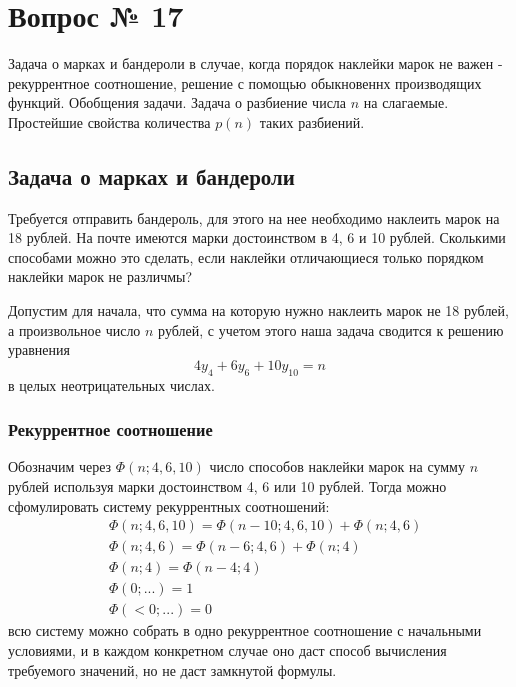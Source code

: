 \chapter{Вопрос № 17}

Задача о марках и бандероли в случае, когда порядок наклейки марок не важен - рекуррентное соотношение, решение с помощью обыкновеннх производящих функций. Обобщения задачи. Задача о разбиение числа $n$ на слагаемые. Простейшие свойства количества $p\left(n\right)$ таких разбиений.

\section{Задача о марках и бандероли}

Требуется отправить бандероль, для этого на нее необходимо наклеить марок на 18 рублей. На почте имеются марки достоинством в 4, 6 и 10 рублей. Сколькими способами можно это сделать, если наклейки отличающиеся только порядком наклейки марок не различмы?

Допустим для начала, что сумма на которую нужно наклеить марок не 18 рублей, а произвольное число $n$ рублей, с учетом этого наша задача сводится к решению уравнения $$ 4 y_4 + 6 y_6 + 10 y_{10} = n $$ в целых неотрицательных числах.

\subsection{Рекуррентное соотношение}

Обозначим через $\Phi\left(n;4,6,10\right)$ число способов наклейки марок на сумму $n$ рублей используя марки достоинством 4, 6 или 10 рублей. Тогда можно сфомулировать систему рекуррентных соотношений:
\begin{equation}
	\begin{split}
		& \Phi\left(n;4,6,10\right) = \Phi\left(n-10;4,6,10\right) + \Phi\left(n;4,6\right) \\
		& \Phi\left(n;4,6\right) = \Phi\left(n-6;4,6\right) + \Phi\left(n;4\right) \\
		& \Phi\left(n;4\right) = \Phi\left(n-4;4\right) \\
		& \Phi\left(0;...\right) = 1 \\
		& \Phi\left(<0; ...\right) = 0
	\end{split}
\end{equation}
всю систему можно собрать в одно рекуррентное соотношение с начальными условиями, и в каждом конкретном случае оно даст способ вычисления требуемого значений, но не даст замкнутой формулы.

